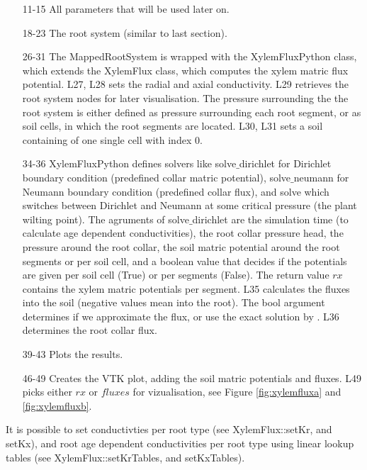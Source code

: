 
\begin{itemize}

\item[11-15] All parameters that will be used later on.

\item[18-23] The root system (similar to last section). 

\item[26-31] The MappedRootSystem is wrapped with the XylemFluxPython class, which extends the XylemFlux class, which computes the xylem matric flux potential. L27, L28 sets the radial and axial conductivity. L29 retrieves the root system nodes for later visualisation. The pressure surrounding the the root system is either defined as pressure surrounding each root segment, or as soil cells, in which the root segments are located. L30, L31 sets a soil containing of one single cell with index 0. 

\item[34-36] XylemFluxPython defines solvers like solve$\_$dirichlet for Dirichlet boundary condition (predefined collar matric potential), solve$\_$neumann for Neumann boundary condition (predefined collar flux), and solve which switches between Dirichlet and Neumann at some critical pressure (the plant wilting point).
The agruments of solve$\_$dirichlet are the simulation time (to calculate age dependent conductivities), the root collar pressure head, the pressure around the root collar, the soil matric potential around the root segments or per soil cell, and a boolean value that decides if the potentials are given per soil cell (True) or per segments (False). The return value $rx$ contains the xylem matric potentials per segment. L35 calculates the fluxes into the soil (negative values mean into the root). The bool argument determines if we approximate the flux, or use the exact solution by \cite{meunier2017hybrid}.
L36 determines the root collar flux.

\item[39-43] Plots the results.

\item[46-49] Creates the VTK plot, adding the soil matric potentials and fluxes. L49 picks either $rx$ or $fluxes$ for vizualisation, see Figure \ref{fig:xylemfluxa} and \ref{fig:xylemfluxb}.

\end{itemize}

It is possible to set conductivties per root type (see XylemFlux::setKr, and setKx), and root age dependent conductivities per root type using linear lookup tables (see XylemFlux::setKrTables, and setKxTables).

